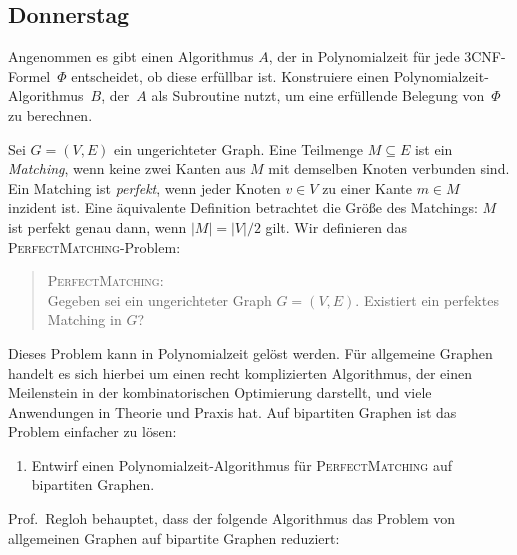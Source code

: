 \documentclass{uebung_cs}
\begin{document}
\subsection*{Donnerstag}

\begin{exercise}
	Angenommen es gibt einen Algorithmus $A$, der in Polynomialzeit für jede 3CNF-Formel~$\Phi$ entscheidet, ob diese erfüllbar ist.
	Konstruiere einen Polynomialzeit-Algorithmus~$B$, der~$A$ als Subroutine nutzt, um eine erfüllende Belegung von~$\Phi$ zu berechnen.
\end{exercise}

\begin{exercise}[Perfektes Matching][\atschool]
	Sei $G = (V,E)$ ein ungerichteter Graph. Eine Teilmenge $M \subseteq E$ ist ein \textit{Matching}, wenn keine zwei Kanten aus $M$ mit demselben Knoten verbunden sind. Ein Matching ist \textit{perfekt}, wenn jeder Knoten $v \in V$ zu einer Kante $m \in M$ inzident ist. Eine äquivalente Definition betrachtet die Größe des Matchings: $M$ ist perfekt genau dann, wenn $|M| = |V|/2$ gilt. Wir definieren das \textsc{PerfectMatching}-Problem:
	\begin{quote}
		\textsc{PerfectMatching}:\\
		Gegeben sei ein ungerichteter Graph $G = (V,E)$. Existiert ein perfektes Matching in $G$?
	\end{quote}
	Dieses Problem kann in Polynomialzeit gelöst werden. Für allgemeine Graphen handelt es sich hierbei um einen recht komplizierten Algorithmus, der einen Meilenstein in der kombinatorischen Optimierung darstellt, und viele Anwendungen in Theorie und Praxis hat.
	Auf bipartiten Graphen ist das Problem einfacher zu lösen:
	\begin{enumerate}
		\item\medium Entwirf einen Polynomialzeit-Algorithmus für \textsc{PerfectMatching} auf bipartiten Graphen.\\
	\end{enumerate}
	Prof.\ Regloh behauptet, dass der folgende Algorithmus das Problem von allgemeinen Graphen auf bipartite Graphen reduziert:

\end{exercise}
\end{document}
